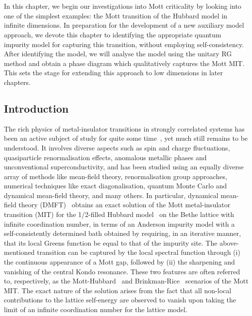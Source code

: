 \chapter{\chapC}\label{sec:ESIAM}
In this chapter, we begin our investigations into Mott criticality by looking into one of the simplest examples: the Mott transition of the Hubbard model in infinite dimensions. In preparation for the development of a new auxiliary model approach, we devote this chapter to identifying the appropriate quantum impurity model for capturing this transition, without employing self-consistency. After identifying the model, we will analyse the model using the unitary RG method and obtain a phase diagram which qualitatively captures the Mott MIT. This sets the stage for extending this approach to low dimensions in later chapters.

\section{Introduction}
The rich physics of metal-insulator transitions in strongly correlated systems has been an active subject of study for quite some time~\cite{Mott_RMP_1968,milligan_1985,imada1998metal}, yet much still remains to be understood. It involves diverse aspects such as spin and charge fluctuations, quasiparticle renormalisation effects, anomalous metallic phases and unconventional superconductivity, and has been studied using an equally diverse array of methods like mean-field theory, renormalisation group approaches, numerical techniques like exact diagonalisation, quantum Monte Carlo and dynamical mean-field theory, and many others. In particular, dynamical mean-field theory (DMFT)~\cite{kuramoto1987,Cox1988,metzner_volhardt_1989,zhang_1993,georges1996,parcollet_2004,maier_2005,kotliar_2006,ohashi_2008} obtains an exact solution of the Mott metal-insulator transition (MIT) for the 1/2-filled Hubbard model~\cite{Mott_1949,gutzwiller_1963,kanamori_1963,hubbard1963electron,brinkman_rice_1970} on the Bethe lattice with infinite coordination number, in terms of an Anderson impurity model with a self-consistently determined bath obtained by requiring, in an iterative manner, that its local Greens function be equal to that of the impurity site. The above-mentioned transition can be captured by the local spectral function through (i) the continuous appearance of a Mott gap, followed by (ii) the sharpening and vanishing of the central Kondo resonance. These two features are often referred to, respectively, as the Mott-Hubbard~\cite{hubbard1963electron} and Brinkman-Rice~\cite{brinkman_rice_1970} scenarios of the Mott MIT. The exact nature of the solution arises from the fact that all non-local contributions to the lattice self-energy are observed to vanish upon taking the limit of an infinite coordination number for the lattice model. 
